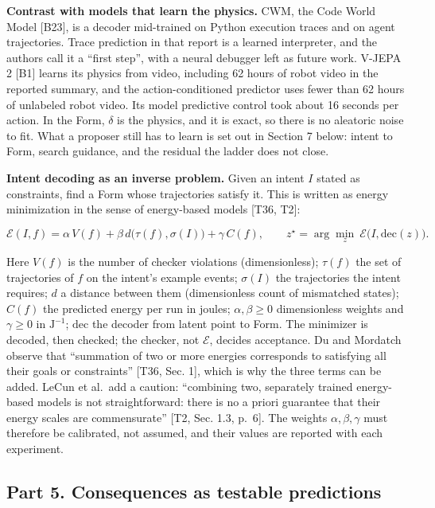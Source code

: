 \documentclass[10pt,letterpaper]{article}
\begin{document}
\textbf{Contrast with models that learn the physics.} CWM, the Code
World Model {[}B23{]}, is a decoder mid-trained on Python execution
traces and on agent trajectories. Trace prediction in that report is a
learned interpreter, and the authors call it a ``first step'', with a
neural debugger left as future work. V-JEPA 2 {[}B1{]} learns its
physics from video, including 62 hours of robot video in the reported
summary, and the action-conditioned predictor uses fewer than 62 hours
of unlabeled robot video. Its model predictive control took about 16
seconds per action. In the Form, \(\delta\) is the physics, and it is
exact, so there is no aleatoric noise to fit. What a proposer still has
to learn is set out in Section 7 below: intent to Form, search guidance,
and the residual the ladder does not close.

\textbf{Intent decoding as an inverse problem.} Given an intent \(I\)
stated as constraints, find a Form whose trajectories satisfy it. This
is written as energy minimization in the sense of energy-based models
{[}T36, T2{]}:

\[
\mathcal{E}(I,f)=\alpha\,V(f)+\beta\,d\big(\tau(f),\sigma(I)\big)+\gamma\,C(f),\qquad z^\star=\arg\min_{z}\ \mathcal{E}\big(I,\mathrm{dec}(z)\big).
\]

Here \(V(f)\) is the number of checker violations (dimensionless);
\(\tau(f)\) the set of trajectories of \(f\) on the intent's example
events; \(\sigma(I)\) the trajectories the intent requires; \(d\) a
distance between them (dimensionless count of mismatched states);
\(C(f)\) the predicted energy per run in joules; \(\alpha,\beta\ge0\)
dimensionless weights and \(\gamma\ge0\) in \(\mathrm{J}^{-1}\);
\(\mathrm{dec}\) the decoder from latent point to Form. The minimizer is
decoded, then checked; the checker, not \(\mathcal{E}\), decides
acceptance. Du and Mordatch observe that ``summation of two or more
energies corresponds to satisfying all their goals or constraints''
{[}T36, Sec. 1{]}, which is why the three terms can be added. LeCun et
al.~add a caution: ``combining two, separately trained energy-based
models is not straightforward: there is no a priori guarantee that their
energy scales are commensurate'' {[}T2, Sec. 1.3, p.~6{]}. The weights
\(\alpha,\beta,\gamma\) must therefore be calibrated, not assumed, and
their values are reported with each experiment.

\subsection{Part 5. Consequences as testable
predictions}\label{part-5.-consequences-as-testable-predictions}
\end{document}
